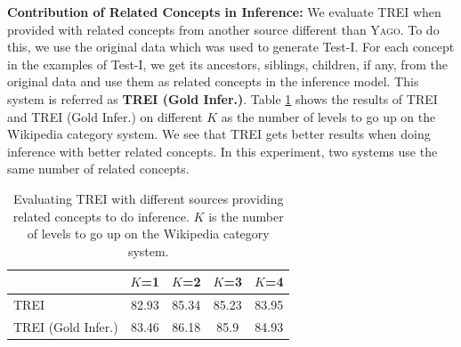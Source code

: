 {\bf Contribution of Related Concepts in Inference:} We evaluate TREI
when provided with related concepts from another source different than
\textsc{Yago}.  To do this, we use the original data which was used to
generate Test-I. For each concept in the examples of Test-I, we get
its ancestors, siblings, children, if any, from the original data and
use them as related concepts in the inference model. This system is
referred as {\bf TREI (Gold Infer.)}. Table
\ref{table:related-concepts} shows the results of TREI and TREI (Gold
Infer.) on different $K$ as the number of levels to go up on the
Wikipedia category system.  We see that TREI gets better results when
doing inference with better related concepts. In this experiment, two
systems use the same number of related concepts.

\begin{table}[!t]
  \small
  \begin{center}
    \begin{tabular}{l|c|c|c|c}
      &    $K$=1  &    $K$=2  &    $K$=3  &    $K$=4  \\
      \hline
      TREI             &  82.93  &  85.34  &  85.23  &  83.95  \\
      TREI (Gold Infer.)  &  83.46  &  86.18  &   85.9  &  84.93  \\
    \end{tabular}
    \caption{Evaluating TREI with different sources providing related
      concepts to do inference. $K$ is the number of levels to go up
      on the Wikipedia category system.}
    \label{table:related-concepts}
  \end{center}
\end{table}


